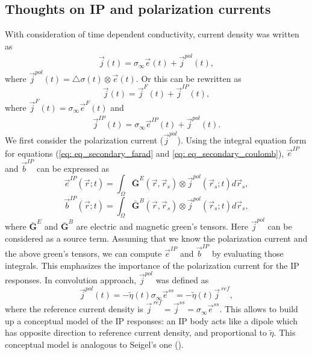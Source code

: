 \documentclass[a4paper, 11pt]{article}
\newcommand{\siginf}{\sigma_\infty}
\newcommand{\dsig}{\triangle\sigma}
\renewcommand {\j}  { {\vec j} }
\renewcommand {\b}  { {\vec b} }
\newcommand {\e}  { {\vec e} }
\newcommand{\peta}{\tilde{\eta}}
\begin{document}
\subsection{Thoughts on IP and polarization currents}
With consideration of time dependent conductivity, current density was written as
\begin{eqnarray*}
    \j(t) = \siginf\e(t)+\j^{pol}(t),
\end{eqnarray*}
where $\j^{pol}(t)=\dsig(t)\otimes\e(t)$. Or this can be rewritten as
\begin{equation*}
    \j(t) = \j^{F}(t) + \j^{IP}(t),
\end{equation*}
where $\j^{F}(t)=\siginf\e^{F}(t)$ and
\begin{eqnarray}
		\j^{IP}(t) = \siginf\e^{IP}(t) + \j^{pol}(t).
        \label{eq: jip_with_ja}
\end{eqnarray}
We first consider the polarization current ($\j^{pol}$). Using the integral equation form for equations (\ref{eq: eq_secondary_farad} and \ref{eq: eq_secondary_coulomb}), $\e^{IP}$ and $\b^{IP}$ can be expressed as 
\begin{equation}
    \e^{IP}(\vec{r}; t) = \int_{\Omega} \bar{\mathbf{G}}^{E}(\vec{r}, \vec{r}_s)\otimes\j^{pol}(\vec{r}_s; t) d\vec{r}_s,
\end{equation}
\begin{equation}
    \b^{IP}(\vec{r}; t) = \int_{\Omega} \bar{\mathbf{G}}^{B}(\vec{r}, \vec{r}_s)\otimes\j^{pol}(\vec{r}_s; t) d\vec{r}_s,
\end{equation}
where $\bar{\mathbf{G}}^{E}$ and $\bar{\mathbf{G}}^{B}$ are electric and magnetic green's tensors. Here $\j^{pol}$ can be considered as a source term. Assuming that we know the polarization current and the above green's tensors, we can compute $\e^{IP}$ and $\b^{IP}$ by evaluating those integrals. This emphasizes the importance of the polarization current for the IP responses. In convolution approach, $\j^{pol}$ was defined as
\begin{equation}
    \j^{pol}(t) = -\peta(t)\siginf\e^{ss}=-\peta(t)\j^{\ ref},
\end{equation}
where the reference current density is $\j^{\ ref} = \j^{ss} = \siginf\e^{ss}$.
This allows to build up a conceptual model of the IP responses: an IP body acts like a dipole which has opposite direction to reference current density, and proportional to $\peta$. This conceptual model is analogous to Seigel's one (\cite{seigel1959}).
\end{document}
